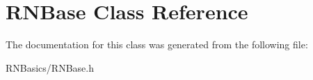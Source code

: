 \hypertarget{class_r_n_base}{}\section{R\+N\+Base Class Reference}
\label{class_r_n_base}


The documentation for this class was generated from the following file\+:\begin{DoxyCompactItemize}
\item 
R\+N\+Basics/R\+N\+Base.\+h\end{DoxyCompactItemize}
